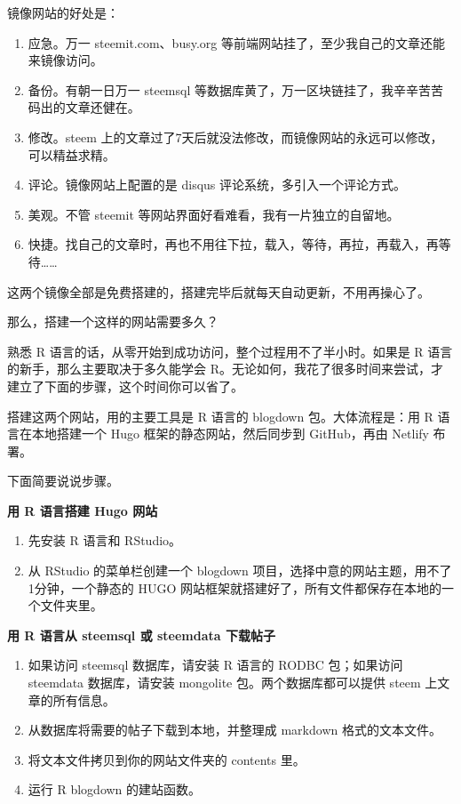\documentclass[]{ctexbook}
\begin{document}
镜像网站的好处是：

\begin{enumerate}
\def\labelenumi{\arabic{enumi}.}
\item
  应急。万一 steemit.com、busy.org 等前端网站挂了，至少我自己的文章还能来镜像访问。
\item
  备份。有朝一日万一 steemsql 等数据库黄了，万一区块链挂了，我辛辛苦苦码出的文章还健在。
\item
  修改。steem 上的文章过了7天后就没法修改，而镜像网站的永远可以修改，可以精益求精。
\item
  评论。镜像网站上配置的是 disqus 评论系统，多引入一个评论方式。
\item
  美观。不管 steemit 等网站界面好看难看，我有一片独立的自留地。
\item
  快捷。找自己的文章时，再也不用往下拉，载入，等待，再拉，再载入，再等待\ldots{}\ldots{}
\end{enumerate}

这两个镜像全部是免费搭建的，搭建完毕后就每天自动更新，不用再操心了。

那么，搭建一个这样的网站需要多久？

熟悉 R 语言的话，从零开始到成功访问，整个过程用不了半小时。如果是 R 语言的新手，那么主要取决于多久能学会 R。无论如何，我花了很多时间来尝试，才建立了下面的步骤，这个时间你可以省了。

搭建这两个网站，用的主要工具是 R 语言的 blogdown 包。大体流程是：用 R 语言在本地搭建一个 Hugo 框架的静态网站，然后同步到 GitHub，再由 Netlify 布署。

下面简要说说步骤。

\textbf{用 R 语言搭建 Hugo 网站}

\begin{enumerate}
\def\labelenumi{\arabic{enumi}.}
\item
  先安装 R 语言和 RStudio。
\item
  从 RStudio 的菜单栏创建一个 blogdown 项目，选择中意的网站主题，用不了1分钟，一个静态的 HUGO 网站框架就搭建好了，所有文件都保存在本地的一个文件夹里。
\end{enumerate}

\textbf{用 R 语言从 steemsql 或 steemdata 下载帖子}

\begin{enumerate}
\def\labelenumi{\arabic{enumi}.}
\item
  如果访问 steemsql 数据库，请安装 R 语言的 RODBC 包；如果访问 steemdata 数据库，请安装 mongolite 包。两个数据库都可以提供 steem 上文章的所有信息。
\item
  从数据库将需要的帖子下载到本地，并整理成 markdown 格式的文本文件。
\item
  将文本文件拷贝到你的网站文件夹的 contents 里。
\item
  运行 R blogdown 的建站函数。
\end{enumerate}
\end{document}
